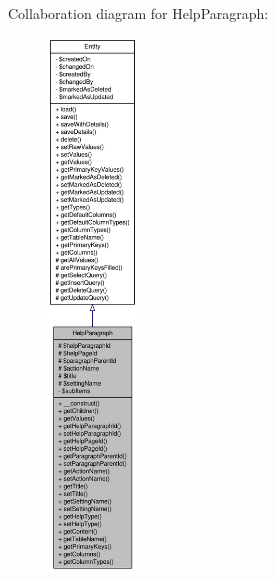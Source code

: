 Collaboration diagram for HelpParagraph:\nopagebreak
\begin{figure}[H]
\begin{center}
\leavevmode
\includegraphics[height=400pt]{classHelpParagraph__coll__graph}
\end{center}
\end{figure}
